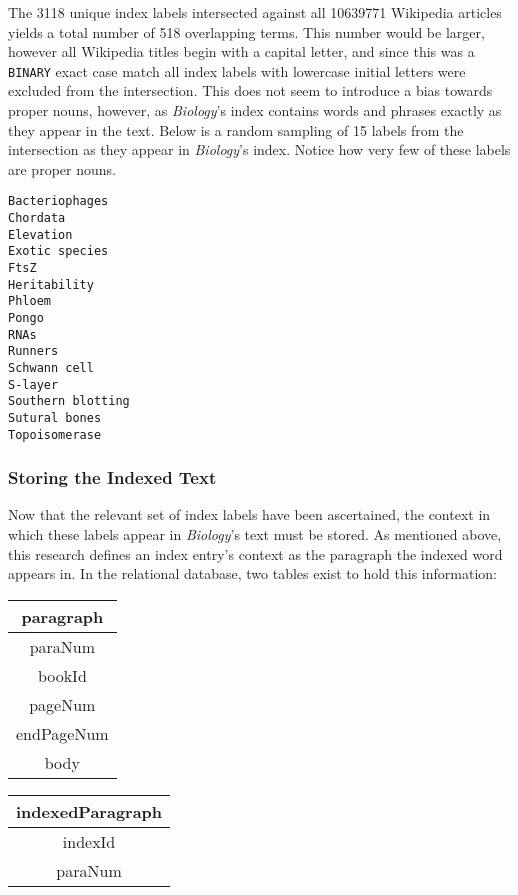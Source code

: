 The 3118 unique index labels intersected against all 10639771 Wikipedia articles yields a total number of 518 overlapping terms.
This number would be larger, however all Wikipedia titles begin with a capital letter, and since this was a {\tt BINARY} exact case match all index labels with lowercase initial letters were excluded from the intersection.
This does not seem to introduce a bias towards proper nouns, however, as {\it Biology}'s index contains words and phrases exactly as they appear in the text.
Below is a random sampling of 15 labels from the intersection as they appear in {\it Biology}'s index.
Notice how very few of these labels are proper nouns.

\begin{multicols}{3}
\begin{verbatim}
Bacteriophages
Chordata
Elevation
Exotic species
FtsZ
Heritability
Phloem
Pongo
RNAs
Runners
Schwann cell
S-layer
Southern blotting
Sutural bones
Topoisomerase
\end{verbatim}
\end{multicols}

\subsubsection{Storing the Indexed Text}

Now that the relevant set of index labels have been ascertained, the context in which these labels appear in {\it Biology}'s text must be stored.
As mentioned above, this research defines an index entry's context as the paragraph the indexed word appears in.
In the relational database, two tables exist to hold this information:

\begin{center}
\begin{tabular}{|c|}
\hline 
\textbf{paragraph} \\ 
\hline 
paraNum \\ 
\hline 
bookId \\ 
\hline 
pageNum \\ 
\hline 
endPageNum \\ 
\hline 
body \\ 
\hline 
\end{tabular}
\end{center}

\begin{center}
\begin{tabular}{|c|}
\hline 
\textbf{indexedParagraph} \\ 
\hline 
indexId \\ 
\hline 
paraNum \\ 
\hline 
\end{tabular} 
\end{center}

